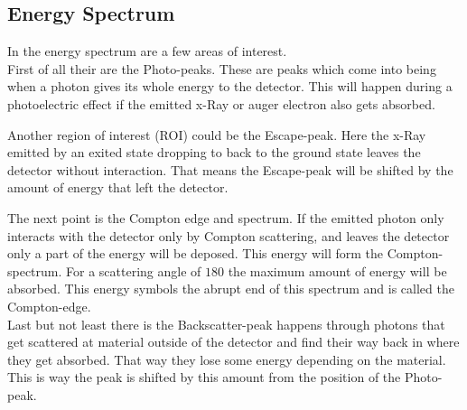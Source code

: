 \documentclass[30pt,a4paper]{article}
\begin{document}
 	\subsection{Energy Spectrum}
 	In the energy spectrum are a few areas of interest. \\
 	First of all their are the Photo-peaks. These are peaks which come into being when a photon gives its whole energy to the detector. This will happen during a photoelectric effect if the emitted x-Ray or auger electron also gets absorbed.\par
 	Another region of interest (ROI) could be the Escape-peak. Here the x-Ray emitted by an exited state dropping to back to the ground state leaves the detector without interaction. That means the Escape-peak will be shifted by the amount of energy that left the detector.\par
 	The next point is the Compton edge and spectrum. If the emitted photon only interacts with the detector only by Compton scattering, and leaves the detector only a part of the energy will be deposed. This energy will form the Compton-spectrum. For a scattering angle of $180$ the maximum amount of energy will be absorbed. This energy symbols the abrupt end of this spectrum and is called the Compton-edge.\\
 	Last but not least there is the Backscatter-peak happens through photons that get scattered at material outside of the detector and find their way back in where they get absorbed. That way they lose some energy depending on the material. This is way the peak is shifted by this amount from the position of the Photo-peak. 
\end{document}

